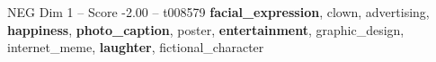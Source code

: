\begin{textsample}{NEG Dim 1 – Score -2.00 – t008579}  \label{ex:f1_neg_014}
\textbf{facial\_expression}, clown, advertising, \textbf{happiness}, \textbf{photo\_caption}, poster, \textbf{entertainment}, graphic\_design, internet\_meme, \textbf{laughter}, fictional\_character

\end{textsample}
